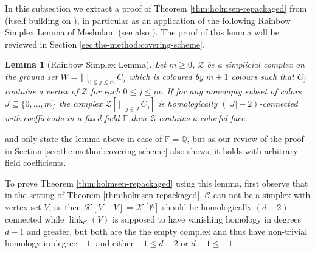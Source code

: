 \documentclass[a4paper,11pt,reqno, english]{amsart}
\newtheorem{lemma}[theorem]{Lemma}
\theoremstyle{definition}
\theoremstyle{remark}
\DeclareMathOperator{\link}{\mathrm{link}}
\begin{document}
In this subsection we extract a proof of Theorem \ref{thm:holmsen-repackaged} from \cite{Holmsen2016} (itself building on \cite{KalaiMeshulam2005}), in particular as an application of the following Rainbow Simplex Lemma of Meshulam \cite[Proposition 1.6]{Meshulam2003} (see also \cite[Proposition 3.1]{KalaiMeshulam2005}). The proof of this lemma will be reviewed in Section \ref{sec:the-method:covering-scheme}.
\begin{lemma}[Rainbow Simplex Lemma]\label{lem:meshulam-colorful}
    Let $m\geq0$, $\mathscr{Z}$ be a simplicial complex on the ground set $W=\bigsqcup_{0\leq j\leq m}C_j$ which is coloured by $m+1$ colours such that $C_j$ contains a vertex of $\mathscr{Z}$ for each $0\leq j\leq m$. If for any nonempty subset of colors $J\subseteq\{0,\ldots,m\}$ the complex $\mathscr{Z}[\bigsqcup_{j\in J}C_j]$ is homologically $(|J|-2)$-connected with coefficients in a fixed field $\mathbb{F}$ then $\mathscr{Z}$ contains a colorful face.
\end{lemma}
\cite[Proposition 1.6]{Meshulam2003} and \cite[Proposition 3.1]{KalaiMeshulam2005} only state the lemma above in case of $\mathbb{F}=\mathbb{Q}$, but as our review of the proof in Section \ref{sec:the-method:covering-scheme} also shows, it holds with arbitrary field coefficients.

To prove Theorem \ref{thm:holmsen-repackaged} using this lemma, first observe that in the setting of Theorem \ref{thm:holmsen-repackaged}, $\mathscr{C}$ can not be a simplex with vertex set $V$, as then $\mathscr{K}[V-V]=\mathscr{K}[\emptyset]$ should be homologically $(d-2)$-connected while $\link_\mathscr{C}(V)$ is supposed to have vanishing homology in degrees $d-1$ and greater, but both are the the empty complex and thus have non-trivial homology in degree $-1$, and either $-1\leq d-2$ or $d-1\leq -1$.
\end{document}
